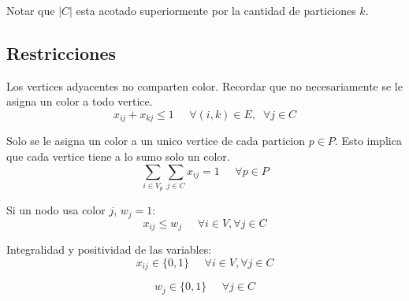 Notar que $|C|$ esta acotado superiormente por la cantidad de particiones $k$.

\vspace{10px}

\subsection{Restricciones}
\label{restricciones}

Los vertices adyacentes no comparten color. Recordar que no necesariamente se le asigna un color a todo vertice.
\begin{equation}
x_{ij} + x_{kj} \leq 1 \;\;\;\;\; \forall (i,k) \in E,\;\; \forall j \in C
\end{equation}

Solo se le asigna un color a un unico vertice de cada particion $p \in P$. Esto implica que cada vertice tiene a lo sumo solo un color.
\begin{equation}
\sum_{i \in V_p} \sum_{j \in C} x_{ij} = 1 \;\;\;\;\; \forall p \in P
\end{equation}

Si un nodo usa color $j$, $w_j = 1$:
\begin{equation}
x_{ij} \leq w_j \;\;\;\;\; \forall i \in V, \forall j \in C
\end{equation}

Integralidad y positividad de las variables:
\begin{equation}
x_{ij} \in \{0,1\} \;\;\;\;\; \forall i \in V, \forall j \in C
\end{equation}

\begin{equation}
w_j \in \{0,1\} \;\;\;\;\; \forall j \in C
\end{equation}